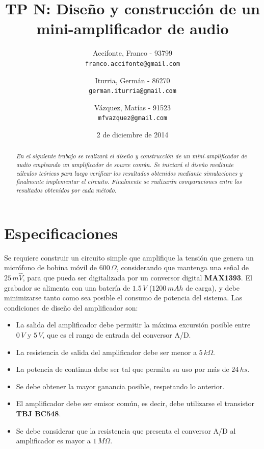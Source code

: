 \documentclass[10pt,spanish,a4paper,openany,notitlepage]{article}
\begin{document}
\title{\textbf{TP N: Diseño y construcción de un mini-amplificador de audio}}
\author{
  Accifonte, Franco - 93799\\
  \texttt{franco.accifonte@gmail.com}  
  \and
  Iturria, Germán  - 86270 \\
  \texttt{german.iturria@gmail.com}
  \and
   Vázquez, Matías - 91523\\
  \texttt{mfvazquez@gmail.com}
}
\date{2 de diciembre de 2014}
\maketitle

\begin{abstract} %
\emph{En el siguiente trabajo se realizará el diseño y construcción de un
mini-amplificador de audio empleando un amplificador de source común. Se
iniciará el diseño mediante cálculos teóricos para luego verificar los
resultados obtenidos mediante simulaciones y finalmente implementar
el circuito. Finalmente se realizarán comparaciones entre los resultados
obtenidos por cada método.}
\end{abstract}

\section{Especificaciones}

Se requiere construir un circuito simple que amplifique la tensión que
genera un micrófono de bobina móvil de $600\, \unit{\Omega}$, considerando
que mantenga una señal de $25\, \unit{m\widehat{V}}$, para que pueda ser digitalizada
por un conversor digital {\bf MAX1393}. El grabador se alimenta con
una batería de $1.5\,\unit{V}$ ($1200\, \unit{mAh}$ de carga), y debe
minimizarse tanto como sea posible el consumo de potencia del sistema.
Las condiciones de diseño del amplificador son:

\begin{itemize}
\item La salida del amplificador debe permitir la máxima excursión
posible entre $0\, \unit{V}$ y $5\, \unit{V}$, que es el rango de entrada
del conversor A/D.
\item La resistencia de salida del amplificador debe ser menor a $5\, \unit{k\Omega}$.
\item La potencia de continua debe ser tal que permita su uso por más de
$24\, \unit{hs}$.
\item Se debe obtener la mayor ganancia posible, respetando lo anterior.
\item El amplificador debe ser emisor común, es decir, debe utilizarse
el transistor {\bf TBJ BC548}.
\item Se debe considerar que la resistencia que presenta el conversor A/D
al amplificador es mayor a $1\, \unit{M\Omega}$.
\end{itemize} 
\end{document}
